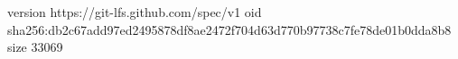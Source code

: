 version https://git-lfs.github.com/spec/v1
oid sha256:db2c67add97ed2495878df8ae2472f704d63d770b97738c7fe78de01b0dda8b8
size 33069
